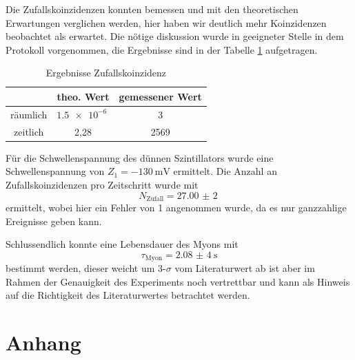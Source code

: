 \documentclass{article}
\begin{document}
Die Zufallskoinzidenzen konnten bemessen und mit den theoretischen Erwartungen verglichen werden, hier haben wir deutlich mehr Koinzidenzen beobachtet als erwartet. Die nötige diskussion wurde in geeigneter Stelle in dem 
Protokoll vorgenommen, die Ergebnisse sind in der Tabelle \ref{tab:ZufallskoinzidenzFazit} aufgetragen.
\begin{table}[H]
    \centering
    \caption{Ergebnisse Zufallskoinzidenz}
    \begin{tabular}{|c|c|c|}
        \hline
        & theo. Wert & gemessener Wert \\ \hline \hline
        räumlich & $\SI{1,5e-6}{}$ & 3 \\ \hline
        zeitlich & 2,28 & 2569 \\ \hline
    \end{tabular}
    \label{tab:ZufallskoinzidenzFazit}
\end{table}

Für die Schwellenspannung des dünnen Szintillators wurde eine Schwellenspannung von $Z_1=\SI{-130}{\milli\volt}$ ermittelt.
Die Anzahl an Zufallskoinzidenzen pro Zeitschritt wurde mit 
\begin{displaymath}
    N_\text{Zufall}=\SI{27,00(2)}{}
\end{displaymath}
ermittelt, wobei hier ein Fehler von 1 angenommen wurde, da es nur ganzzahlige Ereignisse geben kann.

Schlussendlich konnte eine Lebensdauer des Myons mit 
\begin{displaymath}
    \tau_\text{Myon}=\SI{2,08(4)}{\second}
\end{displaymath}
bestimmt werden, dieser weicht um $3$-$\sigma$ vom Literaturwert ab ist aber im Rahmen der Genauigkeit des Experiments noch vertrettbar und kann als Hinweis auf die Richtigkeit des Literaturwertes betrachtet werden.


\section{Anhang}
\end{document}

